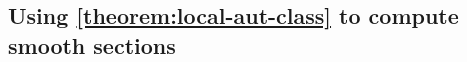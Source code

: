 \documentclass[12 pt]{amsart}
\theoremstyle{plain}
\newtheorem{lemma}[theorem]{Lemma}
\theoremstyle{definition}
\theoremstyle{remark}
\numberwithin{equation}{section}
\newcommand\bp{\mathbb P}
\newcommand\fm{{\mathfrak m}}
\newcommand\scz{\mathscr Z}
\DeclareMathOperator\spec{\operatorname{Spec}}
\newcommand\reshilb[2]{\scz_{#1,#2}} %
\DeclareMathOperator\chr{\operatorname{char}}
\begin{document}
%
\subsection{Using \autoref{theorem:local-aut-class} to compute smooth sections}
\label{subsection:smooth-sections}
\end{document}
